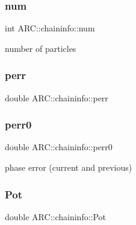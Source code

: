 \hypertarget{classARC_1_1chaininfo_a4c85d251b74ed69a458e1b33b9f1173c}{}\label{classARC_1_1chaininfo_a4c85d251b74ed69a458e1b33b9f1173c} 
\subsubsection{\texorpdfstring{num}{num}}
{\footnotesize\ttfamily int A\+R\+C\+::chaininfo\+::num}



number of particles 

\hypertarget{classARC_1_1chaininfo_a83dc2c6904ccf789ac299db95fa57bc5}{}\label{classARC_1_1chaininfo_a83dc2c6904ccf789ac299db95fa57bc5} 
\subsubsection{\texorpdfstring{perr}{perr}}
{\footnotesize\ttfamily double A\+R\+C\+::chaininfo\+::perr}

\hypertarget{classARC_1_1chaininfo_aa5687aa0deb33f878f2283befe978d5f}{}\label{classARC_1_1chaininfo_aa5687aa0deb33f878f2283befe978d5f} 
\subsubsection{\texorpdfstring{perr0}{perr0}}
{\footnotesize\ttfamily double A\+R\+C\+::chaininfo\+::perr0}



phase error (current and previous) 

\hypertarget{classARC_1_1chaininfo_afcefd59678495b4fb0e42b5b481cd875}{}\label{classARC_1_1chaininfo_afcefd59678495b4fb0e42b5b481cd875} 
\subsubsection{\texorpdfstring{Pot}{Pot}}
{\footnotesize\ttfamily double A\+R\+C\+::chaininfo\+::\+Pot}

\hypertarget{classARC_1_1chaininfo_a64ae72bf5fd209d92b95393826f2a358}{}\label{classARC_1_1chaininfo_a64ae72bf5fd209d92b95393826f2a358} 

